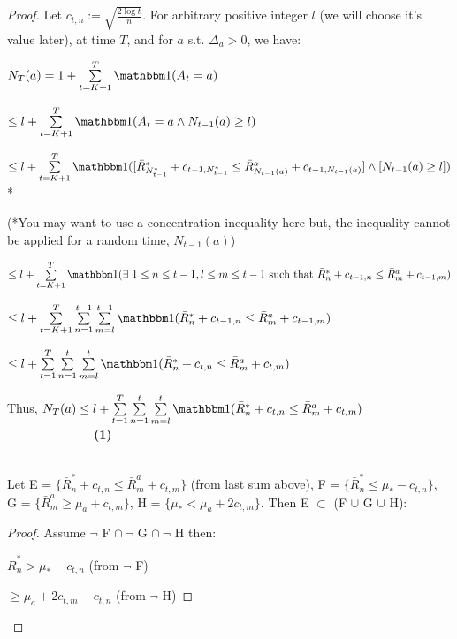 \documentclass[11pt]{article}
\begin{document}
\begin{proof} Let $c_{t,n} := \sqrt{\frac{2\log t}{n}}$.  For arbitrary positive integer $l$ (we will choose it's value later), at time $T$, and for $a$ s.t. $\Delta_a > 0$, we have:

$N_T(a) = 1 + \sum\limits^T_{t = K + 1} \ind (A_t = a)$

$\leq l + \sum\limits^T_{t = K + 1} \ind (A_t = a \wedge N_{t-1}(a) \geq l)$

$\leq l + \sum\limits^T_{t = K + 1} \ind ([\bar R^*_{N_{t-1}^*} + c_{t-1,N_{t-1}^*} \leq \bar R^a_{N_{t-1}(a)} + c_{t-1,N_{t-1}(a)}] \wedge [N_{t-1}(a) \geq l]) $*

(*{\scriptsize You may want to use a concentration inequality here but, the inequality cannot be applied for a random time, $N_{t-1}(a)$})

$\leq l +  \sum\limits^T_{t = K + 1} \ind( \exists \  1 \leq n \leq t-1, l \leq m \leq t-1 \text{ such that } \bar R^*_{n} + c_{t-1,n} \leq \bar R^a_{m} + c_{t-1,m}   ) $

$ \leq l +  \sum\limits^T_{t = K + 1}  \sum\limits^{t-1}_{n = 1}  \sum\limits^{t-1}_{m = l} \ind (\bar R^*_{n} + c_{t-1,n} \leq \bar R^a_{m} + c_{t-1,m}  )$

$ \leq l +  \sum\limits^T_{t = 1}  \sum\limits^{t}_{n = 1}  \sum\limits^{t}_{m = l} \ind (\bar R^*_{n} + c_{t,n} \leq \bar R^a_{m} + c_{t,m}  )$ 

Thus, $N_T(a)  \leq l +  \sum\limits^T_{t = 1}  \sum\limits^{t}_{n = 1}  \sum\limits^{t}_{m = l} \ind (\bar R^*_{n} + c_{t,n} \leq \bar R^a_{m} + c_{t,m} )$ \ \ \ \ \ \ \ \ \  \ \ \ \ \  {\bf{(1)}}
\\
\\

\begin{lemma}\label{lem}
Let E = $\{ \bar R^*_{n} + c_{t,n} \leq \bar R^a_{m} + c_{t,m} \}$ (from last sum above), F = $\{ \bar R^*_{n} \leq \mu_* - c_{t,n} \}$,\\ G = $\{ \bar R^a_{m} \geq \mu_a + c_{t,m} \}$, H = $\{ \mu_* < \mu_a + 2c_{t,m} \}$.  Then E $\subset $ (F $\cup$ G $\cup$ H):
\end{lemma}



\begin{proof} Assume $\neg $ F $\cap \  \neg$ G $\cap \  \neg$ H then:

$ \bar R^*_{n} > \mu_* - c_{t,n}$  (from $\neg $ F)

$ \geq   \mu_a + 2c_{t,m} - c_{t,n} $	(from $\neg $ H)


\end{proof}
\end{proof}
\end{document}
